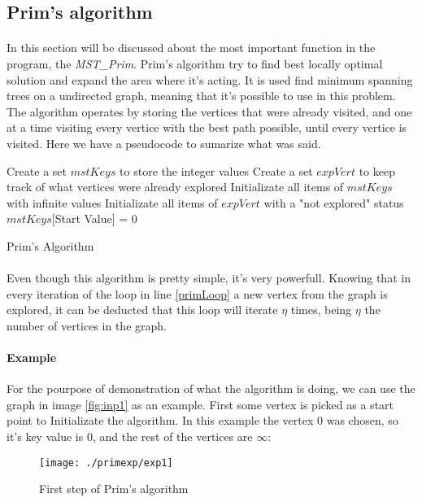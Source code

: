 \documentclass[titlepage]{article}
\begin{document}
        \subsection{Prim's algorithm}
        \paragraph{}
        In this section will be discussed about the most important function in the program, the \emph{MST\_Prim}. Prim's algorithm try to find best locally optimal solution and expand the area where it's acting. It is used find minimum spanning trees on a undirected graph, meaning that it's possible to use in this problem. The algorithm operates by storing the vertices that were already visited, and one at a time visiting every vertice with the best path possible, until every vertice is visited. Here we have a pseudocode to sumarize what was said.
        \begin{algorithm}[h]
            \SetAlgoLined
            Create a set $mstKeys$ to store the integer values\;
            Create a set $expVert$ to keep track of what vertices were already explored\;
            Initializate all items of $mstKeys$ with infinite values\;
            Initializate all items of $expVert$ with a "not explored" status\;
            $mstKeys$[Start Value] = 0\;
            \caption{Prim's Algorithm\label{Prim}}
        \end{algorithm}
        \paragraph{}
        Even though this algorithm is pretty simple, it's very powerfull. Knowing that in every iteration of the loop in line \ref{primLoop} a new vertex from the graph is explored, it can be deducted that this loop will iterate $\eta$ times, being $\eta$ the number of vertices in the graph.
        \paragraph{Example} 
        For the pourpose of demonstration of what the algorithm is doing, we can use the graph in image \ref{fig:inp1} as an example. First some vertex is picked as a start point to Initializate the algorithm. In this example the vertex $0$ was chosen, so it's key value is $0$, and the rest of the vertices are $\infty$:
        \begin{figure}[h]
            \begin{center}
                \texttt{[image: ./primexp/exp1]}
                \caption{First step of Prim's algorithm}
            \end{center}
        \end{figure}
\end{document}
